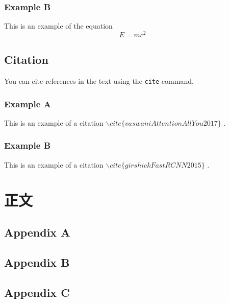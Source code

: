 \documentclass{NEXT-SCNUThesis}
\begin{document}
    \subsection{Example B}
    This is an example of the equation
    \begin{equation}
        E=mc^{2}
    \end{equation}

    \section{Citation}
    You can cite references in the text using the \texttt{cite} command.
    \subsection{Example A}
    This is an example of a citation
    $\backslash cite\{vaswaniAttentionAllYou2017\}$
    \cite{vaswaniAttentionAllYou2017}.
    \subsection{Example B}
    This is an example of a citation $\backslash cite\{girshickFastRCNN2015\}$ \cite{girshickFastRCNN2015}.

    \chapter{正文}

    \appendix
    \section{Appendix A}
    \section{Appendix B}
    \section{Appendix C}

    \acknowledgements
\end{document}
